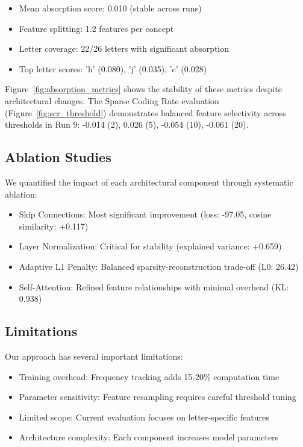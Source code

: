\documentclass{article} %
\begin{document}
\begin{itemize}
    \item Mean absorption score: 0.010 (stable across runs)
    \item Feature splitting: 1.2 features per concept
    \item Letter coverage: 22/26 letters with significant absorption
    \item Top letter scores: 'h' (0.080), 'j' (0.035), 'c' (0.028)
\end{itemize}

Figure~\ref{fig:absorption_metrics} shows the stability of these metrics despite architectural changes. The Sparse Coding Rate evaluation (Figure~\ref{fig:scr_threshold}) demonstrates balanced feature selectivity across thresholds in Run 9: -0.014 (2), 0.026 (5), -0.054 (10), -0.061 (20).

\subsection{Ablation Studies}
We quantified the impact of each architectural component through systematic ablation:

\begin{itemize}
    \item Skip Connections: Most significant improvement (loss: -97.05, cosine similarity: +0.117)
    \item Layer Normalization: Critical for stability (explained variance: +0.659)
    \item Adaptive L1 Penalty: Balanced sparsity-reconstruction trade-off (L0: 26.42)
    \item Self-Attention: Refined feature relationships with minimal overhead (KL: 0.938)
\end{itemize}

\subsection{Limitations}
Our approach has several important limitations:

\begin{itemize}
    \item Training overhead: Frequency tracking adds 15-20\% computation time
    \item Parameter sensitivity: Feature resampling requires careful threshold tuning
    \item Limited scope: Current evaluation focuses on letter-specific features
    \item Architecture complexity: Each component increases model parameters
\end{itemize}
\end{document}
